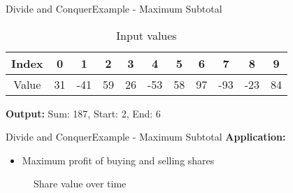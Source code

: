 \begin{frame}{Divide and Conquer}{Example - Maximum Subtotal}
  \begin{example}
    \vspace{-1em}
    \begin{table}[!t]
      \caption{Input values}
      \begin{tabular}{c|c|c|c|c|c|c|c|c|c|c}
        Index & 0 & 1 & 2 & 3 & 4 & 5 & 6 & 7 & 8 & 9\\
        \midrule
        Value & 31 & -41 & 59 & 26 & -53 & 58 & 97 & -93 & -23 & 84
      \end{tabular}
      \label{tab:divide_and_conquer:max_subtotal_example_values}
    \end{table}
    \vspace{6em}
    \textbf{Output:} Sum: 187, Start: 2, End: 6
  \end{example}
\end{frame}


\begin{frame}{Divide and Conquer}{Example - Maximum Subtotal}
  \textbf{Application:}
  \begin{itemize}
    \item
      Maximum profit of buying and selling shares
  \end{itemize}
  \begin{figure}
    \begin{adjustbox}{width=\linewidth}
      
    \end{adjustbox}
    \caption{Share value over time}
    \label{fig:divide_and_conquer:shares_value}
  \end{figure}
\end{frame}



